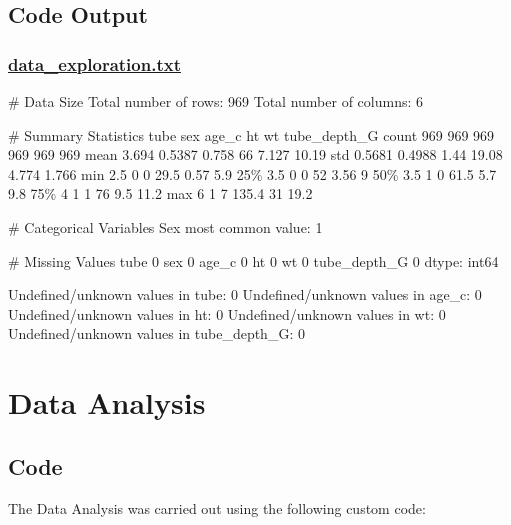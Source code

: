 \documentclass[11pt]{article}
\begin{document}
\subsection{Code Output}\hypertarget{file-data-exploration-txt}{}

\subsubsection*{\hyperlink{code-Data Exploration-data-exploration-txt}{data\_exploration.txt}}

\begin{codeoutput}
\# Data Size
Total number of rows: 969
Total number of columns: 6

\# Summary Statistics
        tube    sex  age\_c    ht    wt  tube\_depth\_G
count    969    969    969   969   969           969
mean   3.694 0.5387  0.758    66 7.127         10.19
std   0.5681 0.4988   1.44 19.08 4.774         1.766
min      2.5      0      0  29.5  0.57           5.9
25\%      3.5      0      0    52  3.56             9
50\%      3.5      1      0  61.5   5.7           9.8
75\%        4      1      1    76   9.5          11.2
max        6      1      7 135.4    31          19.2

\# Categorical Variables
Sex most common value: 1

\# Missing Values
tube            0
sex             0
age\_c           0
ht              0
wt              0
tube\_depth\_G    0
dtype: int64

Undefined/unknown values in tube: 0
Undefined/unknown values in age\_c: 0
Undefined/unknown values in ht: 0
Undefined/unknown values in wt: 0
Undefined/unknown values in tube\_depth\_G: 0
\end{codeoutput}

\section{Data Analysis}
\subsection{{Code}}
The Data Analysis was carried out using the following custom code:
\end{document}
